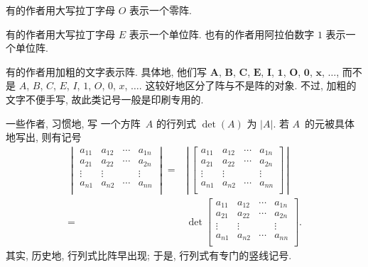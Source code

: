 有的作者用大写拉丁字母 \(O\) 表示一个零阵.

有的作者用大写拉丁字母 \(E\) 表示一个单位阵.
也有的作者用阿拉伯数字 \(1\) 表示一个单位阵.

有的作者用加粗的文字表示阵.
具体地, 他们写
\(\mathbf{A}\),
\(\mathbf{B}\),
\(\mathbf{C}\),
\(\mathbf{E}\),
\(\mathbf{I}\),
\(\mathbf{1}\),
\(\mathbf{O}\),
\(\mathbf{0}\),
\(\mathbf{x}\),
\(\dots\),
而不是
\(A\), \(B\), \(C\),
\(E\), \(I\), \(1\),
\(O\), \(0\),
\(x\), \(\dots\).
这较好地区分了阵与不是阵的对象.
不过, 加粗的文字不便手写,
故此类记号一般是印刷专用的.

一些作者, 习惯地, 写%
一个方阵~\(A\) 的行列式
\(\det {(A)}\) 为 \(|A|\).
若 \(A\)~的元被具体地写出,
则有记号
\begin{align*}
    \begin{vmatrix}
        a_{11} & a_{12} & \cdots & a_{1n} \\
        a_{21} & a_{22} & \cdots & a_{2n} \\
        \vdots & \vdots & {}     & \vdots \\
        a_{n1} & a_{n2} & \cdots & a_{nn} \\
    \end{vmatrix}
    = {} &
    \left|\,
    \begin{bmatrix}
        a_{11} & a_{12} & \cdots & a_{1n} \\
        a_{21} & a_{22} & \cdots & a_{2n} \\
        \vdots & \vdots & {}     & \vdots \\
        a_{n1} & a_{n2} & \cdots & a_{nn} \\
    \end{bmatrix}
    \,\right|
    \\
    = {} &
    \det {
        \begin{bmatrix}
            a_{11} & a_{12} & \cdots & a_{1n} \\
            a_{21} & a_{22} & \cdots & a_{2n} \\
            \vdots & \vdots & {}     & \vdots \\
            a_{n1} & a_{n2} & \cdots & a_{nn} \\
        \end{bmatrix}
    }.
\end{align*}
其实, 历史地, 行列式比阵早出现;
于是, 行列式有专门的竖线记号.

